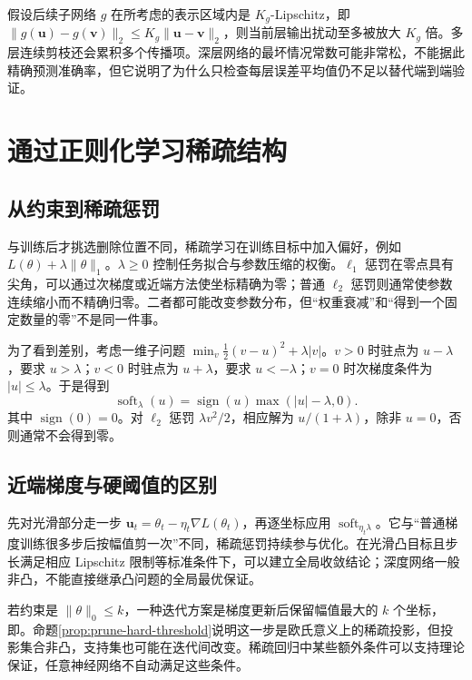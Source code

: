\documentclass[UTF8,12pt,a4paper,fontset=fandol]{ctexart}
\begin{document}
假设后续子网络 $g$ 在所考虑的表示区域内是 $K_g$-Lipschitz，即 $\|g(\mathbf u)-g(\mathbf v)\|_2\leq K_g\|\mathbf u-\mathbf v\|_2$，则当前层输出扰动至多被放大 $K_g$ 倍。多层连续剪枝还会累积多个传播项。深层网络的最坏情况常数可能非常松，不能据此精确预测准确率，但它说明了为什么只检查每层误差平均值仍不足以替代端到端验证。

\section{通过正则化学习稀疏结构}
\label{sec:prune-regularization}

\subsection{从约束到稀疏惩罚}
与训练后才挑选删除位置不同，稀疏学习在训练目标中加入偏好，例如 $L(\theta)+\lambda\|\theta\|_1$。$\lambda\geq0$ 控制任务拟合与参数压缩的权衡。$\ell_1$ 惩罚在零点具有尖角，可以通过次梯度或近端方法使坐标精确为零；普通 $\ell_2$ 惩罚则通常使参数连续缩小而不精确归零。二者都可能改变参数分布，但“权重衰减”和“得到一个固定数量的零”不是同一件事。

为了看到差别，考虑一维子问题 $\min_v\tfrac12(v-u)^2+\lambda|v|$。$v>0$ 时驻点为 $u-\lambda$，要求 $u>\lambda$；$v<0$ 时驻点为 $u+\lambda$，要求 $u<-\lambda$；$v=0$ 时次梯度条件为 $|u|\leq\lambda$。于是得到
\begin{equation}
 \operatorname{soft}_{\lambda}(u)
 =\operatorname{sign}(u)\max(|u|-\lambda,0).
 \label{eq:prune-soft}
\end{equation}
其中 $\operatorname{sign}(0)=0$。对 $\ell_2$ 惩罚 $\lambda v^2/2$，相应解为 $u/(1+\lambda)$，除非 $u=0$，否则通常不会得到零。

\subsection{近端梯度与硬阈值的区别}
先对光滑部分走一步 $\mathbf u_t=\theta_t-\eta_t\nabla L(\theta_t)$，再逐坐标应用 $\operatorname{soft}_{\eta_t\lambda}$。它与“普通梯度训练很多步后按幅值剪一次”不同，稀疏惩罚持续参与优化。在光滑凸目标且步长满足相应 Lipschitz 限制等标准条件下，可以建立全局收敛结论；深度网络一般非凸，不能直接继承凸问题的全局最优保证。

若约束是 $\|\theta\|_0\leq k$，一种迭代方案是梯度更新后保留幅值最大的 $k$ 个坐标，即。命题\ref{prop:prune-hard-threshold}说明这一步是欧氏意义上的稀疏投影，但投影集合非凸，支持集也可能在迭代间改变。稀疏回归中某些额外条件可以支持理论保证，任意神经网络不自动满足这些条件。
\end{document}
